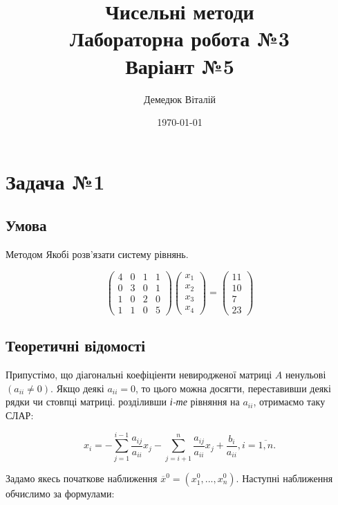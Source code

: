 \documentclass[a4paper, 12pt]{article}
\author{Демедюк Віталій}
\title{Чисельні методи\\
	   Лабораторна робота №3\\
	   Варіант №5}
\date{\today}
\begin{document}
\maketitle

\newpage
\tableofcontents

\newpage
\section{Задача №1}

\subsection{Умова}

Методом Якобі розв’язати систему рівнянь.

\[
\begin{pmatrix}
4 & 0 & 1 & 1 \\
0 & 3 & 0 & 1 \\
1 & 0 & 2 & 0 \\
1 & 1 & 0 & 5
\end{pmatrix}
\begin{pmatrix}
x_1 \\
x_2 \\
x_3 \\
x_4 
\end{pmatrix}
=
\begin{pmatrix}
11 \\
10 \\
7 \\
23 
\end{pmatrix}
\]

\subsection{Теоретичні відомості}

Припустімо, що діагональні коефіціенти невиродженої матриці $A$ ненульові $(a_{ii} \neq 0)$. Якщо деякі $a_{ii} = 0$, то цього можна досягти, переставивши деякі  рядки чи стовпці матриці. розділивши \textit{і-те} рівняння на $a_{ii}$, отримаємо таку СЛАР:

\[
x_i = - \sum_{j=1}^{i-1} \frac{a_{ij}}{a_{ii}}x_j - \sum_{j=i+1}^{n} \frac{a_{ij}}{a_{ii}}x_j + \frac{b_i}{a_{ii}}, i = \overline{1, n}.
\]

Задамо якесь початкове наближення $\overline{x}^0 = (x_{1}^{0},...,x_{n}^{0})$. Наступні наближення обчислимо за формулами:
\end{document}
